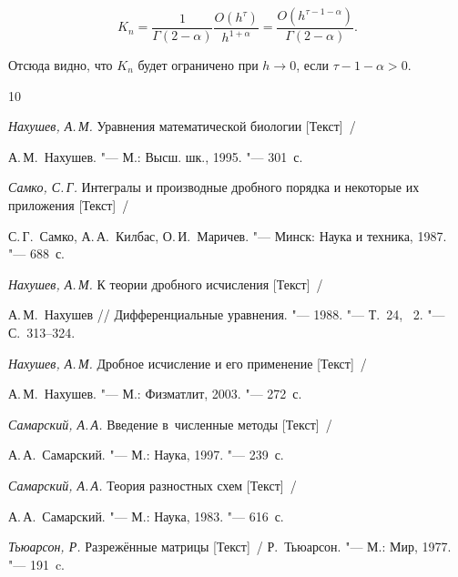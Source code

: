 $$ 

K_n=\frac{1}{\Gamma(2-\alpha)}\frac{O(h^\tau)}{h^{1+\alpha}}= 

\frac{O(h^{\tau-1-\alpha})}{\Gamma(2-\alpha)}. 

$$ 

Отсюда видно, что $K_n$ будет ограничено при $h\to 0$, если $\tau-1-\alpha > 0$. 





\begin{thebibliography}{10}

\item {\it Нахушев, А.\,М.} Уравнения математической биологии [Текст]~/

А.\,М.~Нахушев. "--- М.: Высш. шк., 1995. "--- 301~с.



\item  {\it Самко, С.\,Г.} Интегралы и производные дробного порядка и некоторые их приложения [Текст]~/

С.\,Г.~Самко, А.\,А.~Килбас, О.\,И.~Маричев. "--- Минск: Наука и техника, 1987. "--- 688~с. 



\item {\it Нахушев, А.\,М.} К теории дробного исчисления [Текст]~/

А.\,М.~Нахушев /\!/ Дифференциальные уравнения. "--- 1988. "--- Т.~24, \No~2. "--- С.~313--324.



\item {\it Нахушев, А.\,М.} Дробное исчисление и его применение [Текст]~/

А.\,М.~Нахушев. "--- М.: Физматлит, 2003. "--- 272~с. 



\item {\it Самарский, А.\,А.} Введение в~численные методы [Текст]~/

А.\,А.~Самарский. "--- М.: Наука, 1997. "--- 239~с.



\item {\it Самарский, А.\,А.} Теория разностных схем [Текст]~/

А.\,А.~Самарский. "--- М.: Наука, 1983. "--- 616~с.



\item {\it Тьюарсон, Р.} Разрежённые матрицы [Текст]~/ Р.~Тьюарсон. "--- М.: Мир, 1977. "--- 191~c.




\end{thebibliography}
